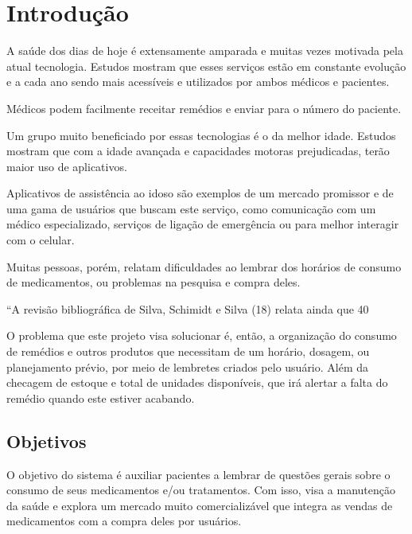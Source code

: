\documentclass[
	article,			%
	12pt,				%
	oneside,			%
	a4paper,			%
    BIBLATEX,           %
	english,			%
	brazil,				%
	sumario=tradicional
	]{abntex2}
\begin{document}
\section{Introdução}

A saúde dos dias de hoje é extensamente amparada e muitas vezes motivada pela atual tecnologia. Estudos mostram que esses serviços estão em constante evolução e a cada ano sendo mais acessíveis e utilizados por ambos médicos e pacientes.

Médicos podem facilmente receitar remédios e enviar para o número do paciente.

Um grupo muito beneficiado por essas tecnologias é o da melhor idade. Estudos mostram que com a idade avançada e capacidades motoras prejudicadas, terão maior uso de aplicativos. \cite{pesquisa-faltando}

Aplicativos de assistência ao idoso são exemplos de um mercado promissor e de uma gama de usuários que buscam este serviço, como comunicação com um médico especializado, serviços de ligação de emergência ou para melhor interagir com o celular.

Muitas pessoas, porém, relatam dificuldades ao lembrar dos horários de consumo de medicamentos, ou problemas na pesquisa e compra deles.

\begin{citacao}
“A revisão bibliográfica de Silva, Schimidt e Silva (18) relata ainda que 40%
\end{citacao}

O problema que este projeto visa solucionar é, então, a organização do consumo de remédios e outros produtos que necessitam de um horário, dosagem, ou planejamento prévio, por meio de lembretes criados pelo usuário. Além da checagem de estoque e total de unidades disponíveis, que irá alertar a falta do remédio quando este estiver acabando.

\subsection{Objetivos}

O objetivo do sistema é auxiliar pacientes a lembrar de questões gerais sobre o consumo de seus medicamentos e/ou tratamentos. Com isso, visa a manutenção da saúde e explora um mercado muito comercializável que integra as vendas de medicamentos com a compra deles por usuários.
\end{document}
